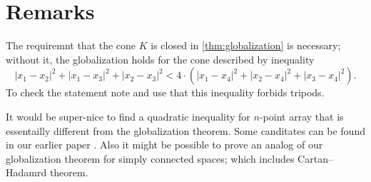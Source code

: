 \documentclass[a4paper,10pt]{article}
\begin{document}
\section{Remarks}
The requiremnt that the cone $K$ is closed in \ref{thm:globalization} is necessary;
without it, the globalization holds for the cone described by inequality
\[|x_1-x_2|^2+|x_1-x_3|^2+|x_2-x_3|^2<4\cdot(|x_1-x_4|^2+|x_2-x_4|^2+|x_3-x_4|^2).\]
To check the statement note and use that this inequality forbids tripods.

It would be super-nice to find a quadratic inequality for $n$-point array that is essentailly different from the globalization theorem.
Some canditates can be found in our earlier paper \cite{lebedeva-petrunin-zolotov}.
Also it might be possible to prove an analog of our globalization theorem for simply connected spaces; which includes Cartan--Hadamrd theorem.

{\sloppy
\def\emph{\textit}
\printbibliography[heading=bibintoc]
\fussy
}
\end{document}
